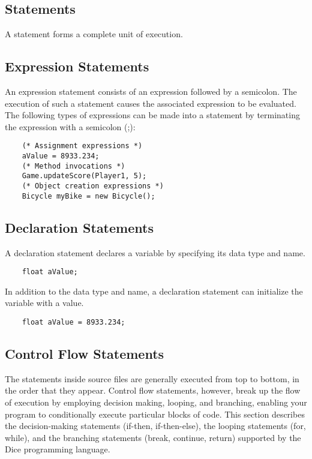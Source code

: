 \begin{homeworkProblem}
	\chapter{Statements}
	A statement forms a complete unit of execution. 

	\section{Expression Statements}
	An expression statement consists of an expression followed by a semicolon. The execution of such a statement causes the associated expression to be evaluated. The following types of expressions can be made into a statement by terminating the expression with a semicolon (;):
	\begin{verbatim}
	(* Assignment expressions *)
	aValue = 8933.234;
	(* Method invocations *)
	Game.updateScore(Player1, 5);
	(* Object creation expressions *)
	Bicycle myBike = new Bicycle();
	\end{verbatim}
	
	\section{Declaration Statements}
	A declaration statement declares a variable by specifying its data type and name.
	\begin{verbatim}
	float aValue;
	\end{verbatim}

	In addition to the data type and name, a declaration statement can initialize the variable with a value.
	\begin{verbatim} 
	float aValue = 8933.234;
	\end{verbatim}
	
	\section{Control Flow Statements}
	The statements inside source files are generally executed from top to bottom, in the order that they appear. Control flow statements, however, break up the flow of execution by employing decision making, looping, and branching, enabling your program to conditionally execute particular blocks of code. This section describes the decision-making statements (if-then, if-then-else), the looping statements (for, while), and the branching statements (break, continue, return) supported by the Dice programming language.


\end{homeworkProblem}
